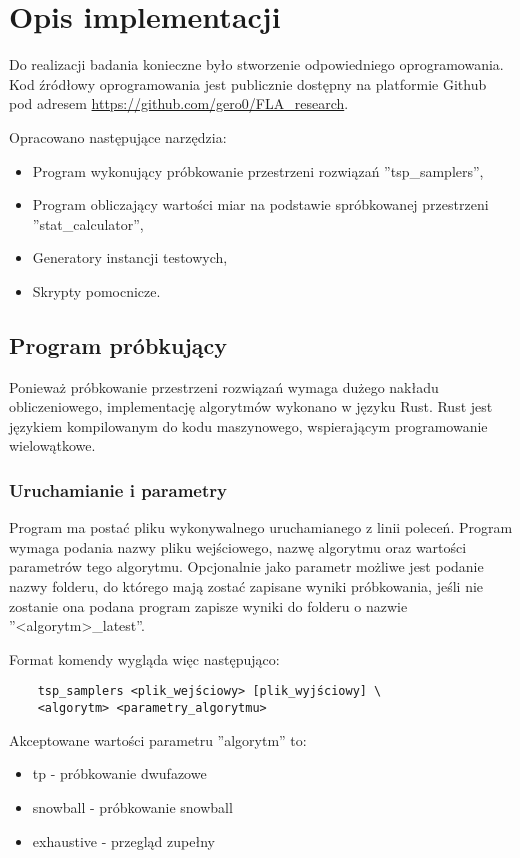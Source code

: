 \chapter{Opis implementacji}
Do realizacji badania konieczne było stworzenie odpowiedniego oprogramowania.
Kod źródłowy oprogramowania jest publicznie dostępny na platformie Github pod adresem
\url{https://github.com/gero0/FLA_research}.

Opracowano następujące narzędzia:
\begin{itemize}
    \item Program wykonujący próbkowanie przestrzeni rozwiązań ''tsp\_samplers'',
    \item Program obliczający wartości miar na podstawie spróbkowanej przestrzeni ''stat\_calculator'',
    \item Generatory instancji testowych,
    \item Skrypty pomocnicze.
\end{itemize}

\section{Program próbkujący}
Ponieważ próbkowanie przestrzeni rozwiązań wymaga dużego nakładu obliczeniowego,
implementację algorytmów wykonano w języku Rust.
Rust jest językiem kompilowanym do kodu maszynowego, wspierającym programowanie wielowątkowe.

\subsection{Uruchamianie i parametry}

Program ma postać pliku wykonywalnego uruchamianego z linii poleceń.
Program wymaga podania nazwy pliku wejściowego, nazwę algorytmu oraz wartości parametrów tego algorytmu.
Opcjonalnie jako parametr możliwe jest podanie nazwy folderu, do którego mają zostać zapisane wyniki próbkowania,
jeśli nie zostanie ona podana program zapisze wyniki do folderu o nazwie ''<algorytm>\_latest''.

Format komendy wygląda więc następująco:
\begin{lstlisting}
    tsp_samplers <plik_wejściowy> [plik_wyjściowy] \
    <algorytm> <parametry_algorytmu>
\end{lstlisting}


Akceptowane wartości parametru ''algorytm'' to:
\begin{itemize}
    \item tp - próbkowanie dwufazowe
    \item snowball - próbkowanie snowball
    \item exhaustive - przegląd zupełny
\end{itemize}

